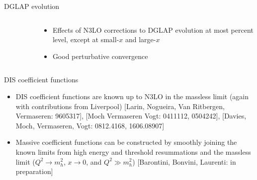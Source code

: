 \documentclass[8pt,t]{beamer}
\begin{document}
\begin{frame}{DGLAP evolution}
\begin{columns}
\begin{column}{0.59\textwidth}
\begin{figure}[!t]
      \end{figure}
    \end{column}
    \begin{column}{0.39\textwidth}
      \begin{itemize}
        \item Effects of N3LO corrections to DGLAP evolution at most percent level, except at small-$x$ and large-$x$
        \item Good perturbative convergence
      \end{itemize}
    \end{column}
  \end{columns}
\end{frame}

\begin{frame}{DIS coefficient functions}
  \begin{itemize}
    \item DIS coefficient functions are known up to N3LO in the massless limit (again with contributions from Liverpool) {\color{gray}\small [Larin, Nogueira, Van Ritbergen, Vermaseren: 9605317], [Moch Vermaseren Vogt: 0411112, 0504242], [Davies, Moch, Vermaseren, Vogt: 0812.4168, 1606.08907]}
    \item Massive coefficient functions can be constructed by smoothly joining the known limits from high energy and threshold resummations and the massless limit ($Q^2 \rightarrow m_h^2$, $x\rightarrow 0$, and $Q^2\gg m_h^2$) {\color{gray}\small [Barontini, Bonvini, Laurenti: in preparation]}
  \end{itemize}


\end{frame}
\end{document}
